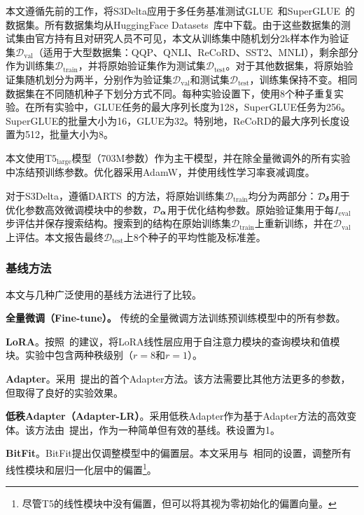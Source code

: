 \label{App:datasetsandptms}
本文遵循先前的工作，将S3Delta应用于多任务基准测试GLUE~\cite{wang2018glue}和SuperGLUE~\cite{NEURIPS2019_4496bf24}的数据集。所有数据集均从HuggingFace Datasets~\cite{lhoest2021datasets}库中下载。由于这些数据集的测试集由官方持有且对研究人员不可见，本文从训练集中随机划分2k样本作为验证集$\mathcal{D}_{\text{val}}$（适用于大型数据集：QQP、QNLI、ReCoRD、SST2、MNLI），剩余部分作为训练集$\mathcal{D}_{\text{train}}$，并将原始验证集作为测试集$\mathcal{D}_{\text{test}}$。对于其他数据集，将原始验证集随机划分为两半，分别作为验证集$\mathcal{D}_{\text{val}}$和测试集$\mathcal{D}_{\text{test}}$，训练集保持不变。相同数据集在不同随机种子下划分方式不同。每种实验设置下，使用8个种子重复实验。在所有实验中，GLUE任务的最大序列长度为128，SuperGLUE任务为256。SuperGLUE的批量大小为16，GLUE为32。特别地，ReCoRD的最大序列长度设置为512，批量大小为8。

本文使用$\text{T}5_{\text{large}}$模型（703M参数）作为主干模型，并在除全量微调外的所有实验中冻结预训练参数。优化器采用AdamW，并使用线性学习率衰减调度。

对于S3Delta，遵循DARTS~\cite{liu2018darts}的方法，将原始训练集$\mathcal{D}_{\text{train}}$均分为两部分：$\mathcal{D}_{\boldsymbol{\delta}}$用于优化参数高效微调模块中的参数，$\mathcal{D}_{\boldsymbol{\alpha}}$用于优化结构参数。原始验证集用于每$I_{\text{eval}}$步评估并保存搜索结构。搜索到的结构在原始训练集$\mathcal{D}_{\text{train}}$上重新训练，并在$\mathcal{D}_{\text{val}}$上评估。本文报告最终$\mathcal{D}_{\text{test}}$上8个种子的平均性能及标准差。
\subsubsection{基线方法}

本文与几种广泛使用的基线方法进行了比较。

\noindent\textbf{全量微调（Fine-tune）。} 传统的全量微调方法训练预训练模型中的所有参数。

\noindent\textbf{LoRA}。按照~\citet{hu2021lora}的建议，将LoRA线性层应用于自注意力模块的查询模块和值模块。实验中包含两种秩级别（$r=8$和$r=1$）。

\noindent\textbf{Adapter}。采用~\citet{houlsby2019parameter}提出的首个Adapter方法。该方法需要比其他方法更多的参数，但取得了良好的实验效果。

\noindent\textbf{低秩Adapter（Adapter-LR）}。采用低秩Adapter作为基于Adapter方法的高效变体。该方法由~\citet{mahabadi2021compacter}提出，作为一种简单但有效的基线。秩设置为1。

\noindent\textbf{BitFit}。BitFit提出仅调整模型中的偏置层。本文采用与~\citet{zaken2021bitfit}相同的设置，调整所有线性模块和层归一化层中的偏置\footnote{尽管T5的线性模块中没有偏置，但可以将其视为零初始化的偏置向量。}。

